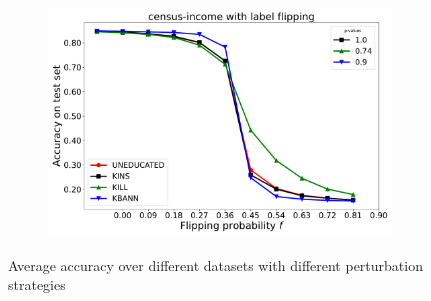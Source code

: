 \begin{figure}
\begin{subfigure}{\cellsize}
		\includegraphics[width=\linewidth]{figures/label_flip/census-income/uneducated-kins-kill-kbann-accuracy-average-curves}
	\end{subfigure}
	\caption{Average accuracy over different datasets with different perturbation strategies}
	\label{fig:accuracy-results}
\end{figure}